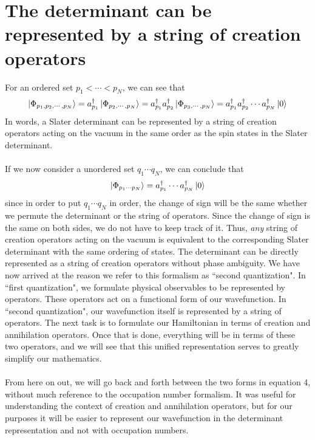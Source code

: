 \documentclass{article}
\begin{document}
\section{The determinant can be represented by a string of creation operators}

For an ordered set $p_1 < \cdots  < p_N$,
we can see that 
\[\ket{\Phi_{p_1, p_2, \cdots, p_N}} = a_{p_1}^\dagger \ket{\Phi_{p_2, \cdots, p_N}} = a_{p_1}^\dagger a_{p_2}^\dagger \ket{\Phi_{p_3, \cdots, p_N}}=
 a_{p_1}^\dagger a_{p_2}^\dagger \cdots a_{p_N}^\dagger \ket{0}\]
In words, a Slater determinant can be represented by a string of creation operators acting on the vacuum in the same order as the spin states in the Slater determinant. \\ \\
If we now consider a unordered set $q_1 \cdots q_N$, we can conclude that 
\begin{equation}\ket{\Phi_{p_1 \cdots p_N}} = a_{p_1}^\dagger \cdots a_{p_N}^\dagger \ket{0}\end{equation}
since in order to put $q_1 \cdots q_N$ in order, the change of sign will be the same whether we permute the determinant or the string of operators. 
Since the change of sign is the same on both sides, we do not have to keep track of it. 
Thus, \textit{any} string of creation operators acting on the vacuum is equivalent to the corresponding Slater determinant with the same ordering of states. 
The determinant can be directly represented as a string of creation operators without phase ambiguity.
We have now arrived at the reason we refer to this formalism as ``second quantization".
In ``first quantization", we formulate physical observables to be represented by operators.
These operators act on a functional form of our wavefunction. 
In ``second quantization", our wavefunction itself is represented by a string of operators. 
The next task is to formulate our Hamiltonian in terms of creation and annihilation operators. 
Once that is done, everything will be in terms of these two operators, and we will see that this unified representation serves to greatly simplify our mathematics.  \\
\\
From here on out, we will go back and forth between the two forms in equation 4, without much reference to the occupation number formalism. 
It was useful for understanding the context of creation and annihilation operators, but for our purposes it will be easier to represent our wavefunction in the determinant representation
and not with occupation numbers. 
\end{document}
